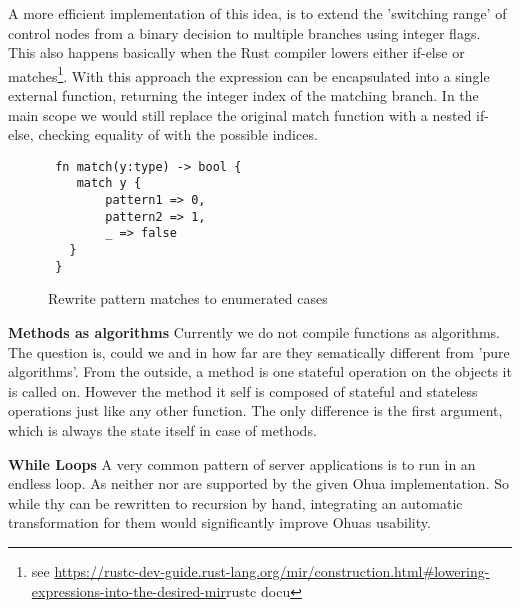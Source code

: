  A more efficient implementation of this idea, is to extend the 'switching range' of control nodes from a binary decision to multiple branches using integer flags. This also happens basically when the Rust compiler lowers either if-else or matches\footnote{see \url{https://rustc-dev-guide.rust-lang.org/mir/construction.html\#lowering-expressions-into-the-desired-mir}{rustc docu}}. With this approach the  expression can be encapsulated into a single external function, returning the integer index of the matching branch. In the main scope we would still replace the original match function with a nested if-else, checking equality of  with the possible indices.  
 
\begin{figure}[H]
\centering
\begin{verbatim}
 fn match(y:type) -> bool {
    match y {
        pattern1 => 0,
        pattern2 => 1,
        _ => false
   }        
 }  
\end{verbatim}
\caption{Rewrite pattern matches to enumerated cases}
\label{fig:MatchHandling2}
\end{figure}
\bigskip


\textbf{Methods as algorithms}
Currently we do not compile  functions as algorithms. The question is, could we and in how far are they sematically different from 'pure algorithms'. From the outside, a method is one stateful operation on the objects it is called on. However the method it self is composed of stateful and stateless operations just like any other function. The only difference is the first argument, which is always the state itself in case of methods. 


\textbf{While Loops}
\label{subsubsec:WhileLoops}
A very common pattern of server applications is to run in an endless loop. As neither  nor  are supported by the given Ohua implementation. So while thy can be rewritten to recursion by hand, integrating an automatic transformation for them would significantly improve Ohuas usability. 

